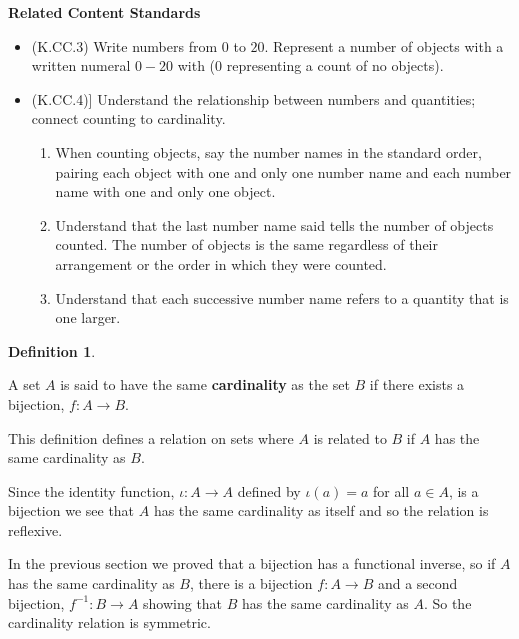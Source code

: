 \documentclass[
]{book}
\providecommand{\tightlist}{%
  \setlength{\itemsep}{0pt}\setlength{\parskip}{0pt}}
\newenvironment{standards}{}{}
\theoremstyle{definition}
\newtheorem{definition}{Definition}[chapter]
\theoremstyle{definition}
\theoremstyle{definition}
\theoremstyle{definition}
\theoremstyle{remark}
\begin{document}
\begin{standards}

\begin{center}
\textbf{Related Content Standards}

\end{center}

\begin{itemize}
\tightlist
\item
  (K.CC.3) Write numbers from \(0\) to \(20\). Represent a number of objects with a written numeral \(0-20\) with (\(0\) representing a count of no objects).
\item
  (K.CC.4){]} Understand the relationship between numbers and quantities; connect counting to cardinality.

  \begin{enumerate}
  \def\labelenumi{\alph{enumi}.}
  \tightlist
  \item
    When counting objects, say the number names in the standard order, pairing each object with one and only one number name and each number name with one and only one object.
  \item
    Understand that the last number name said tells the number of objects counted. The number of objects is the same regardless of their arrangement or the order in which they were counted.
  \item
    Understand that each successive number name refers to a quantity that is one larger.
  \end{enumerate}
\end{itemize}

\end{standards}

\begin{definition}
\protect\hypertarget{def:unlabeled-div-72}{}\label{def:unlabeled-div-72}

A set \(A\) is said to have the same \textbf{cardinality} as the set \(B\) if there exists a bijection, \(f:A\rightarrow B\).

\end{definition}

This definition defines a relation on sets where \(A\) is related to \(B\) if \(A\) has the same cardinality as \(B\).

Since the identity function, \(\iota :A \rightarrow A\) defined by \(\iota(a)=a\) for all \(a\in A\), is a bijection we see that \(A\) has the same cardinality as itself and so the relation is reflexive.

In the previous section we proved that a bijection has a functional inverse, so if \(A\) has the same cardinality as \(B\), there is a bijection \(f:A\rightarrow B\) and a second bijection, \(f^{-1}:B\rightarrow A\) showing that \(B\) has the same cardinality as \(A\). So the cardinality relation is symmetric.
\end{document}
